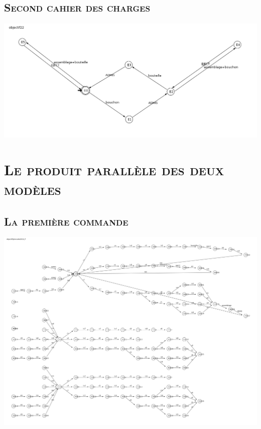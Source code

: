 		 \section{\textsc{Second cahier des charges}} 
		 
		 	\begin{center}
			\includegraphics[scale=0.4]{obj2.png}
			\label{fig5}
			\end{center} 
			
	 \pagebreak

\chapter{\textsc{Le produit parallèle des deux modèles}}

		  \section{\textsc{La première commande}}
		    
		  \begin{center}
			\includegraphics[scale=0.2]{com1.png}
			\label{fig6}
			\end{center}		    
		    
